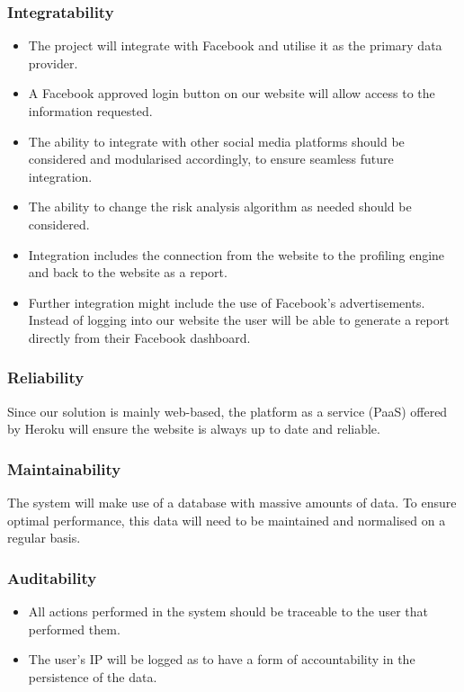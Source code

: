 \documentclass{article}
\begin{document}
		\subsubsection{Integratability}\label{subsubsec:integratability}
		\begin{itemize}
			\item The project will integrate with Facebook and utilise it as the primary data provider.
			\item A Facebook approved login button on our website will allow access to the information requested. 
			\item The ability to integrate with other social media platforms should be considered and modularised accordingly, to ensure seamless future integration. 
			\item The ability to change the risk analysis algorithm as needed should be considered.
			\item Integration includes the connection from the website to the profiling engine and back to the website as a report.
			\item Further integration might include the use of Facebook's advertisements. Instead of logging into our website the user will be able to generate a report directly from their Facebook dashboard.
		\end{itemize}		

		\subsubsection{Reliability}
			Since our solution is mainly web-based, the platform as a service (PaaS) offered by Heroku will ensure the website is always up to date and reliable.

		\subsubsection{Maintainability}
			The system will make use of a database with massive amounts of data. To ensure optimal performance, this data will need to be maintained and normalised on a regular basis.

		\subsubsection{Auditability}
		\begin{itemize}
			\item All actions performed in the system should be traceable to the user that performed them.
			\item The user's IP  will be logged as to have a form of accountability in the persistence of the data.
		\end{itemize}
\end{document}
